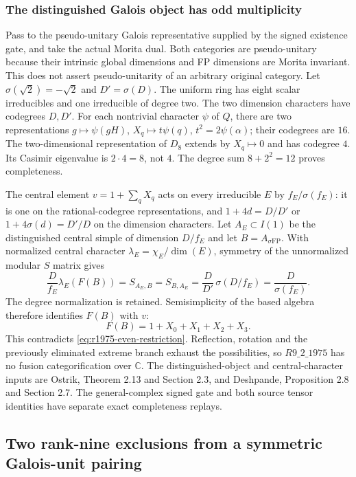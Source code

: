 \subsubsection{The distinguished Galois object has odd multiplicity}
Pass to the pseudo-unitary Galois representative supplied by the signed
existence gate, and take the actual Morita dual. Both categories are
pseudo-unitary because their intrinsic global dimensions and FP dimensions
are Morita invariant. This does not assert pseudo-unitarity of an arbitrary
original category. Let $\sigma(\sqrt2)=-\sqrt2$ and $D'=\sigma(D)$.
The uniform ring has eight scalar irreducibles and one irreducible of
degree two. The two dimension characters have codegrees $D,D'$.
For each nontrivial character $\psi$ of $Q$, there are two representations
$g\mapsto\psi(gH)$, $X_q\mapsto t\psi(q)$, $t^2=2\psi(\alpha)$;
their codegrees are $16$. The two-dimensional representation of $D_8$
extends by $X_q\mapsto0$ and has codegree $4$. Its Casimir eigenvalue
is $2\cdot4=8$, not $4$. The degree sum $8+2^2=12$ proves completeness.

The central element $v=1+\sum_qX_q$ acts on every irreducible $E$ by
$f_E/\sigma(f_E)$: it is one on the rational-codegree representations,
and $1+4d=D/D'$ or $1+4\sigma(d)=D'/D$ on the dimension characters.
Let $A_E\subset I(1)$ be the distinguished central simple of dimension
$D/f_E$ and let $B=A_{\sigma\mathrm{FP}}$. With normalized central
character $\lambda_E=\chi_E/\dim(E)$, symmetry of the unnormalized
modular $S$ matrix gives
\[
 \frac D{f_E}\lambda_E(F(B))=S_{A_E,B}=S_{B,A_E}
 =\frac D{D'}\,\sigma(D/f_E)=\frac D{\sigma(f_E)}.
\]
The degree normalization is retained. Semisimplicity of the based algebra
therefore identifies $F(B)$ with $v$:
\[
 F(B)=1+X_0+X_1+X_2+X_3.
\]
This contradicts \eqref{eq:r1975-even-restriction}. Reflection, rotation
and the previously eliminated extreme branch exhaust the possibilities,
so $R9\_2\_1975$ has no fusion categorification over $\mathbb C$.
The distinguished-object and central-character inputs are Ostrik,
Theorem 2.13 and Section 2.3, and Deshpande, Proposition 2.8 and
Section 2.7. The general-complex signed gate and both source tensor
identities have separate exact completeness replays.

\hypertarget{frontier-two-rank-nine-exclusions-from-a-symmetric-galois-unit-pairing}{%
\subsection{Two rank-nine exclusions from a symmetric Galois-unit
pairing}\label{frontier-two-rank-nine-exclusions-from-a-symmetric-galois-unit-pairing}}

